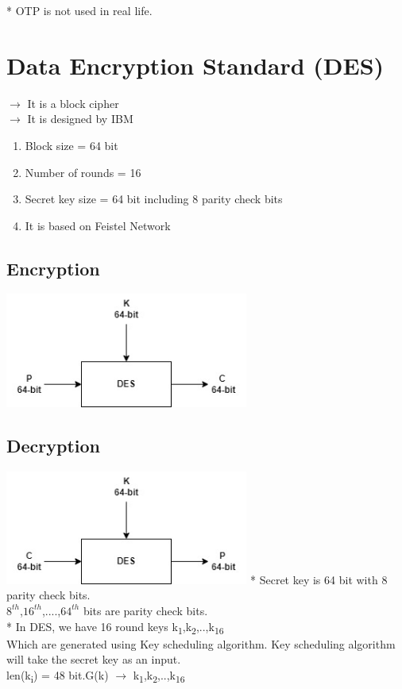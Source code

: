 \documentclass[11pt]{article}
\begin{document}
	\mbox{*} OTP is not used in real life.
	\section{Data Encryption Standard (DES)}
	$\rightarrow$ It is a block cipher\\
	$\rightarrow$ It is designed by IBM\\
	\begin{enumerate}
		\item Block size = 64 bit
		\item Number of rounds = 16
		\item Secret key size = 64 bit including 8 parity check bits
		\item It is based on Feistel Network
	\end{enumerate}
	\subsection{Encryption}
	\centering\includegraphics[width = 8cm]{Encryption.jpg}
	\flushleft
	\subsection{Decryption}
	\centering\includegraphics[width = 8cm]{Decryption.jpg}
	\flushleft
	\mbox{*} Secret key is 64 bit with 8 parity check bits.\\
	$8^{th}$,$16^{th}$,....,$64^{th}$ bits are parity check bits.\\
	\mbox{*} In DES, we have 16 round keys k\textsubscript{1},k\textsubscript{2},..,k\textsubscript{16}\\
	Which are generated using Key scheduling algorithm. Key scheduling algorithm will take the secret key as an input.\\
	len(k\textsubscript{i}) = 48 bit.\hfill G(k) $\rightarrow$ k\textsubscript{1},k\textsubscript{2},..,k\textsubscript{16}
\end{document}
